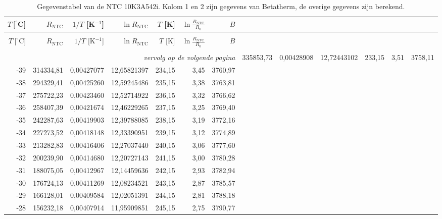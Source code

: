 \documentclass[12pt,a4paper,final,twoside,fleqn]{article}
\newcommand{\rntc}{R_\text{NTC}}
\newcommand{\ntctype}{10K3A542i}
\newcommand{\ntcman}{Betatherm}
\begin{document}
\begin{ThreePartTable}
\begin{longtable}{rrrrrrr}
\caption{Gegevenstabel van de NTC \ntctype. Kolom 1 en 2 zijn gegevens van \ntcman, de
overige gegevens zijn berekend.}\label{tab:specsntc} \\
$T\ [^\circ$C] & $\rntc$ & $1/T$ [K$^{-1}$]     & $\ln \rntc$ & $T$ [K] & $\ln\frac{\rntc}{R_0}$ & $B$\tnote{a} \\[0.3ex]
\hline \\[-2.0ex]
\endfirsthead
$T\ [^\circ$C] & $\rntc$ & $1/T$ [K$^{-1}$]     & $\ln \rntc$ & $T$ [K] & $\ln\frac{\rntc}{R_0}$ & $B$\tnote{a} \\[0.3ex]
\hline \\[-2.0ex]
\endhead
\hline \multicolumn{7}{r}{\footnotesize\sl{vervolg op de volgende pagina}}
\endfoot
\hline
\endlastfoot
-40          & 335853,73 & 0,00428908    & 12,72443102 & 233,15     & 3,51       & 3758,11 \\
-39          & 314334,81 & 0,00427077    & 12,65821397 & 234,15     & 3,45       & 3760,97 \\
-38          & 294329,41 & 0,00425260    & 12,59245486 & 235,15     & 3,38       & 3763,81 \\
-37          & 275722,23 & 0,00423460    & 12,52714922 & 236,15     & 3,32       & 3766,62 \\
-36          & 258407,39 & 0,00421674    & 12,46229265 & 237,15     & 3,25       & 3769,40 \\
-35          & 242287,63 & 0,00419903    & 12,39788085 & 238,15     & 3,19       & 3772,16 \\
-34          & 227273,52 & 0,00418148    & 12,33390951 & 239,15     & 3,12       & 3774,89 \\
-33          & 213282,83 & 0,00416406    & 12,27037440 & 240,15     & 3,06       & 3777,60 \\
-32          & 200239,90 & 0,00414680    & 12,20727143 & 241,15     & 3,00       & 3780,28 \\
-31          & 188075,05 & 0,00412967    & 12,14459636 & 242,15     & 2,93       & 3782,94 \\
-30          & 176724,13 & 0,00411269    & 12,08234521 & 243,15     & 2,87       & 3785,57 \\
-29          & 166128,01 & 0,00409584    & 12,02051391 & 244,15     & 2,81       & 3788,18 \\
-28          & 156232,18 & 0,00407914    & 11,95909851 & 245,15     & 2,75       & 3790,77 \\

\end{longtable}
\end{ThreePartTable}
\end{document}
